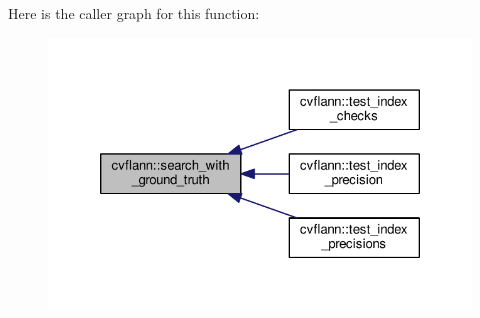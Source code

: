 Here is the caller graph for this function\-:\nopagebreak
\begin{figure}[H]
\begin{center}
\leavevmode
\includegraphics[width=324pt]{namespacecvflann_aff249b1a3cfbd449db4ee469a0cb2a62_icgraph}
\end{center}
\end{figure}


